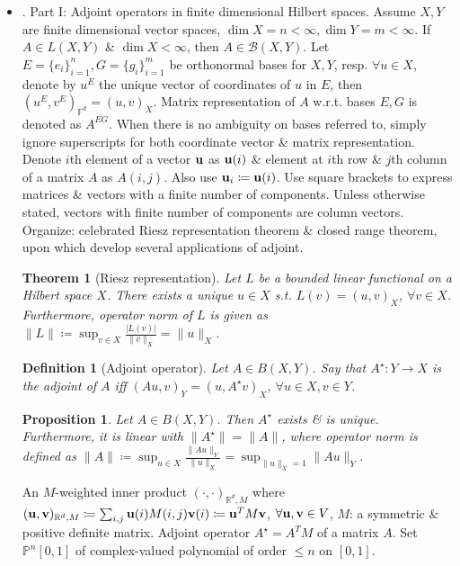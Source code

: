 \documentclass{article}
\newtheorem{definition}{Definition}
\newtheorem{proposition}{Proposition}
\newtheorem{theorem}{Theorem}
\begin{document}
\begin{enumerate}
\begin{itemize}
		\item {. Part I: Adjoint operators in finite dimensional Hilbert spaces.} Assume $X,Y$ are finite dimensional vector spaces, $\dim X = n < \infty,\dim Y = m < \infty$. If $A\in L(X,Y)$ \& $\dim X < \infty$, then $A\in\mathcal{B}(X,Y)$. Let $E = \{e_i\}_{i=1}^n,G = \{g_i\}_{i=1}^m$ be orthonormal bases for $X,Y$, resp. $\forall u\in X$, denote by $u^E$ the unique vector of coordinates of $u$ in $E$, then $(u^E,v^E)_{\mathbb{F}^d} = (u,v)_X$. Matrix representation of $A$ w.r.t. bases $E,G$ is denoted as $A^{EG}$. When there is no ambiguity on bases referred to, simply ignore superscripts for both coordinate vector \& matrix representation. Denote $i$th element of a vector ${\bf u}$ as ${\bf u}(i)$ \& element at $i$th row \& $j$th column of a matrix $A$ as $A(i,j)$. Also use ${\bf u}_i\coloneqq{\bf u}(i)$. Use square brackets to express matrices \& vectors with a finite number of components. Unless otherwise stated, vectors with finite number of components are column vectors. Organize: celebrated Riesz representation theorem \& closed range theorem, upon which develop several applications of adjoint.
		
		\begin{theorem}[Riesz representation]
			Let $L$ be a bounded linear functional on a Hilbert space $X$. There exists a unique $u\in X$ s.t. $L(v) = (u,v)_X$, $\forall v\in X$. Furthermore, operator norm of $L$ is given as $\|L\|\coloneqq\sup_{v\in X} \frac{|L(v)|}{\|v\|_X} = \|u\|_X$.
		\end{theorem}
		
		\begin{definition}[Adjoint operator]
			Let $A\in B(X,Y)$. Say that $A^\star:Y\to X$ is the adjoint of $A$ iff $(Au,v)_Y = (u,A^\star v)_X$, $\forall u\in X,v\in Y$.
		\end{definition}
		
		\begin{proposition}
			Let $A\in B(X,Y)$. Then $A^\star$ exists \& is unique. Furthermore, it is linear with $\|A^\star\| = \|A\|$, where operator norm is defined as $\|A\|\coloneqq\sup_{u\in X} \frac{\|Au\|_Y}{\|u\|_X} = \sup_{\|u\|_X = 1} \|Au\|_Y$.
		\end{proposition}
		An $M$-weighted inner product $(\cdot,\cdot)_{\mathbb{R}^d,M}$ where $({\bf u},{\bf v})_{\mathbb{R}^d,M}\coloneqq\sum_{i,j} {\bf u}(i)M(i,j){\bf v}(i)\coloneqq{\bf u}^TM{\bf v}$, $\forall{\bf u},{\bf v}\in V$, $M$: a symmetric \& positive definite matrix. Adjoint operator $A^\star = A^TM$ of a matrix $A$. Set $\mathbb{P}^n[0,1]$ of complex-valued polynomial of order $\le n$ on $[0,1]$.
		

\end{itemize}
\end{enumerate}
\end{document}
